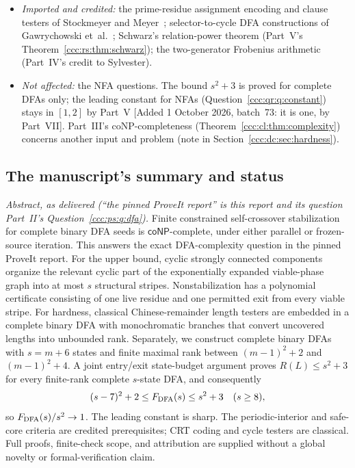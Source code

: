 \documentclass[11pt,letterpaper]{article}
\theoremstyle{definition}
\theoremstyle{remark}
\newcommand{\waddsevthree}[1]{\textup{[}Added 1 October 2026, batch~73: #1\textup{]}}
\newcommand{\coNP}{\mathsf{coNP}}
\begin{document}
\begin{itemize}[leftmargin=1.4em,itemsep=1pt]
\item \emph{Imported and credited:} the prime-residue assignment encoding and
 clause testers of Stockmeyer and Meyer~\cite{SM}; selector-to-cycle DFA
 constructions of Gawrychowski et~al.~\cite{GLRSS}; Schwarz's relation-power
 theorem (Part~V's Theorem~\ref{ccc:rs:thm:schwarz}); the two-generator
 Frobenius arithmetic (Part~IV's credit to Sylvester).
\item \emph{Not affected:} the NFA questions. The bound $s^2+3$ is proved for
 complete DFAs only; the leading constant for NFAs
 (Question~\ref{ccc:qr:q:constant}) stays in $[1,2]$ by Part~V
 \waddsevthree{it is one, by Part~VII}. Part~III's
 coNP-completeness (Theorem~\ref{ccc:cl:thm:complexity}) concerns another
 input and problem (note in Section~\ref{ccc:dc:sec:hardness}).
\end{itemize}

\subsection{The manuscript's summary and status}\label{ccc:dc:sec:abstract}

\emph{Abstract, as delivered (``the pinned ProveIt report'' is this report
and its question Part~II's Question~\ref{ccc:ps:q:dfa}).} Finite constrained
self-crossover stabilization for complete binary DFA seeds is
$\coNP$-complete, under either parallel or frozen-source iteration. This
answers the exact DFA-complexity question in the pinned ProveIt report. For
the upper bound, cyclic strongly connected components organize the relevant
cyclic part of the exponentially expanded viable-phase graph into at most $s$
structural stripes. Nonstabilization has a polynomial certificate consisting
of one live residue and one permitted exit from every viable stripe. For
hardness, classical Chinese-remainder length testers are embedded in a
complete binary DFA with monochromatic branches that convert uncovered
lengths into unbounded rank. Separately, we construct complete binary DFAs
with $s=m+6$ states and finite maximal rank between $(m-1)^2+2$ and
$(m-1)^2+4$. A joint entry/exit state-budget argument proves
$R(L)\le s^2+3$ for every finite-rank complete $s$-state DFA, and
consequently
\[
(s-7)^2+2\le F_{\rm DFA}(s)\le s^2+3\quad(s\ge8),
\]
so $F_{\rm DFA}(s)/s^2\to1$. The leading constant is sharp. The
periodic-interior and safe-core criteria are credited prerequisites; CRT
coding and cycle testers are classical. Full proofs, finite-check scope, and
attribution are supplied without a global novelty or formal-verification
claim.
\end{document}
